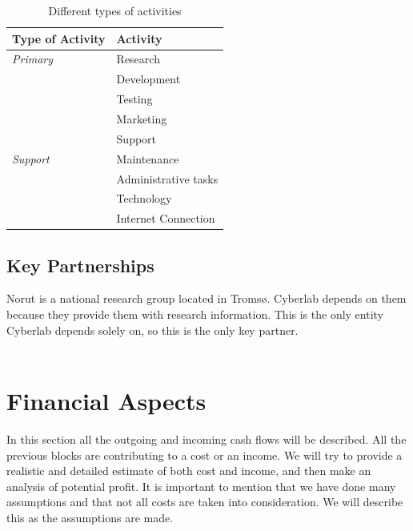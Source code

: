 \begin{table}
\centering
    \begin{tabular}{|l|l|}
        \hline
        \textbf{Type of Activity} & \textbf{Activity} \\ \hline
        \emph{Primary} & Research \\ \cline{2-2}
        & Development \\ \cline{2-2}
	 	& Testing \\ \cline{2-2}
	 	& Marketing \\ \cline{2-2}
	 	& Support \\ \hline
	 	 \emph{Support} & Maintenance \\ \cline{2-2}
	   	& Administrative tasks \\ \cline{2-2}
	   	& Technology \\ \cline{2-2}
	   	& Internet Connection \\
       \hline
    \end{tabular}
    \caption[Different types of activities ]{Different types of activities}
    \label{tab:activities}
\end{table}

\newpage

\subsection{Key Partnerships}

Norut is a national research group located in Tromsø. Cyberlab depends on them because they provide them with research information. This is the only entity Cyberlab depends solely on, so this is the only key partner. \\ \\ 

\section{Financial Aspects}
In this section all the outgoing and incoming cash flows will be described. All the previous blocks are contributing to a cost or an income. We will try to provide a realistic and detailed estimate of both cost and income, and then make an analysis of potential profit. It is important to mention that we have done many assumptions and that not all costs are taken into consideration. We will describe this as the assumptions are made.

